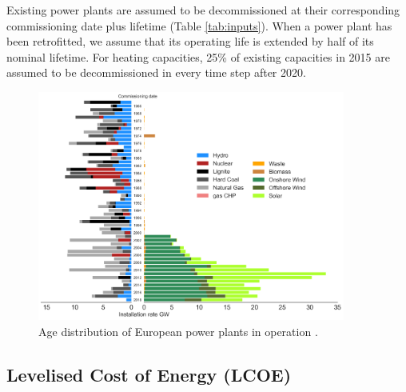 \documentclass[3p]{elsarticle} %
\begin{document}
Existing power plants are assumed to be decommissioned at their corresponding commissioning date plus lifetime (Table \ref{tab:inputs}). When a power plant has been retrofitted, we assume that its operating life is extended by half of its nominal lifetime. 
For heating capacities, 25\% of existing capacities in 2015 are assumed to be decommissioned in every time step after 2020.
\begin{figure}[!h]
\centering
\includegraphics[width=0.9\textwidth]{figures/age_distribution_existing.png}
\caption{Age distribution of European power plants in operation \cite{powerplantmatching, IRENA_2019}.} 
\end{figure}

\FloatBarrier
\subsection{Levelised Cost of Energy (LCOE)}
\end{document}
